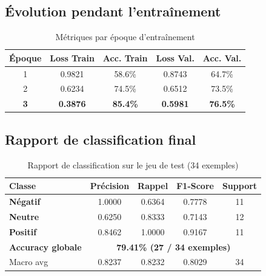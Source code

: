 \documentclass[12pt,a4paper,oneside]{report}
\begin{document}
\subsection{Évolution pendant l'entraînement}

\begin{table}[H]
\centering
\caption{Métriques par époque d'entraînement}
\label{tab:training}
\renewcommand{\arraystretch}{1.5}
\begin{tabular}{ccccc}
\toprule
\rowcolor{bleuprincipal!15}
\textbf{Époque} & \textbf{Loss Train} & \textbf{Acc. Train} & \textbf{Loss Val.} & \textbf{Acc. Val.} \\
\midrule
1 & 0.9821 & 58.6\% & 0.8743 & 64.7\% \\
\rowcolor{gray!8}
2 & 0.6234 & 74.5\% & 0.6512 & 73.5\% \\
\rowcolor{vertprincipal!10}
\textbf{3} & \textbf{0.3876} & \textbf{85.4\%} & \textbf{0.5981} & \textbf{76.5\%} \\
\bottomrule
\end{tabular}
\end{table}

\subsection{Rapport de classification final}

\begin{table}[H]
\centering
\caption{Rapport de classification sur le jeu de test (34 exemples)}
\label{tab:classification}
\renewcommand{\arraystretch}{1.5}
\begin{tabular}{lcccc}
\toprule
\rowcolor{bleuprincipal!15}
\textbf{Classe} & \textbf{Précision} & \textbf{Rappel} & \textbf{F1-Score} & \textbf{Support} \\
\midrule
\textcolor{rougeprincipal}{\textbf{Négatif}} & 1.0000 & 0.6364 & 0.7778 & 11 \\
\rowcolor{gray!8}
\textcolor{jauneneutre!70!black}{\textbf{Neutre}} & 0.6250 & 0.8333 & 0.7143 & 12 \\
\textcolor{vertprincipal}{\textbf{Positif}} & 0.8462 & 1.0000 & 0.9167 & 11 \\
\midrule
\rowcolor{bleuprincipal!8}
\textbf{Accuracy globale} & \multicolumn{4}{c}{\textbf{79.41\% (27 / 34 exemples)}} \\
\midrule
Macro avg & 0.8237 & 0.8232 & 0.8029 & 34 \\
\bottomrule
\end{tabular}
\end{table}
\end{document}
